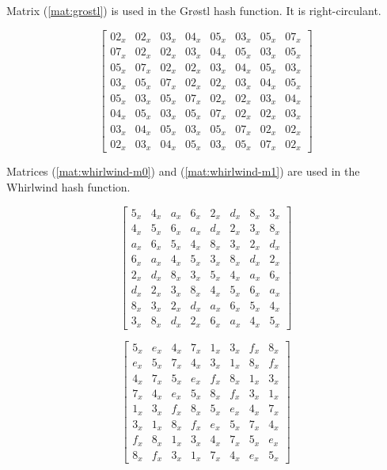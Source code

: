 Matrix (\ref{mat:grostl}) is used in the Gr{\o}stl hash function. It is right-circulant.

\begin{equation}\label{mat:grostl}
\begin{bmatrix}
02_x & 02_x & 03_x & 04_x & 05_x & 03_x & 05_x & 07_x\\
07_x & 02_x & 02_x & 03_x & 04_x & 05_x & 03_x & 05_x\\
05_x & 07_x & 02_x & 02_x & 03_x & 04_x & 05_x & 03_x\\
03_x & 05_x & 07_x & 02_x & 02_x & 03_x & 04_x & 05_x\\
05_x & 03_x & 05_x & 07_x & 02_x & 02_x & 03_x & 04_x\\
04_x & 05_x & 03_x & 05_x & 07_x & 02_x & 02_x & 03_x\\
03_x & 04_x & 05_x & 03_x & 05_x & 07_x & 02_x & 02_x\\
02_x & 03_x & 04_x & 05_x & 03_x & 05_x & 07_x & 02_x
\end{bmatrix}
\end{equation}

Matrices (\ref{mat:whirlwind-m0}) and (\ref{mat:whirlwind-m1}) are used in the Whirlwind hash function.

\begin{equation}\label{mat:whirlwind-m0}
\begin{bmatrix}
5_x & 4_x & a_x & 6_x & 2_x & d_x & 8_x & 3_x\\
4_x & 5_x & 6_x & a_x & d_x & 2_x & 3_x & 8_x\\
a_x & 6_x & 5_x & 4_x & 8_x & 3_x & 2_x & d_x\\
6_x & a_x & 4_x & 5_x & 3_x & 8_x & d_x & 2_x\\
2_x & d_x & 8_x & 3_x & 5_x & 4_x & a_x & 6_x\\
d_x & 2_x & 3_x & 8_x & 4_x & 5_x & 6_x & a_x\\
8_x & 3_x & 2_x & d_x & a_x & 6_x & 5_x & 4_x\\
3_x & 8_x & d_x & 2_x & 6_x & a_x & 4_x & 5_x
\end{bmatrix}
\end{equation}

\begin{equation}\label{mat:whirlwind-m1}
\begin{bmatrix}
5_x & e_x & 4_x & 7_x & 1_x & 3_x & f_x & 8_x\\
e_x & 5_x & 7_x & 4_x & 3_x & 1_x & 8_x & f_x\\
4_x & 7_x & 5_x & e_x & f_x & 8_x & 1_x & 3_x\\
7_x & 4_x & e_x & 5_x & 8_x & f_x & 3_x & 1_x\\
1_x & 3_x & f_x & 8_x & 5_x & e_x & 4_x & 7_x\\
3_x & 1_x & 8_x & f_x & e_x & 5_x & 7_x & 4_x\\
f_x & 8_x & 1_x & 3_x & 4_x & 7_x & 5_x & e_x\\
8_x & f_x & 3_x & 1_x & 7_x & 4_x & e_x & 5_x
\end{bmatrix}
\end{equation}
